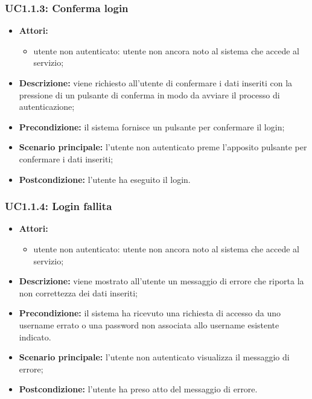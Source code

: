\subsubsection{UC1.1.3: Conferma login}
\begin{itemize}
	\item \textbf{Attori:}
	\begin{itemize}
		\item utente non autenticato: utente non ancora noto al sistema che accede al servizio;
	\end{itemize}
	\item \textbf{Descrizione:} viene richiesto all'utente di confermare i dati inseriti con la pressione di un pulsante di conferma in modo da avviare il processo di autenticazione;
	\item \textbf{Precondizione:} il sistema fornisce un pulsante per confermare il login;
	\item \textbf{Scenario principale:} l'utente non autenticato preme l'apposito pulsante per confermare i dati inseriti;
	\item \textbf{Postcondizione:} l'utente ha eseguito il login.
\end{itemize}

\subsubsection{UC1.1.4: Login fallita}
\begin{itemize}
	\item \textbf{Attori:}
	\begin{itemize}
		\item utente non autenticato: utente non ancora noto al sistema che accede al servizio;
	\end{itemize}
	\item \textbf{Descrizione:} viene mostrato all'utente un messaggio di errore che riporta la non correttezza dei dati inseriti;
	\item \textbf{Precondizione:} il sistema ha ricevuto una richiesta di accesso da uno username errato o una password non associata allo username esistente indicato.
	\item \textbf{Scenario principale:} l'utente non autenticato visualizza il messaggio di errore;
	\item \textbf{Postcondizione:} l'utente ha preso atto del messaggio di errore.
\end{itemize}

\pagebreak


